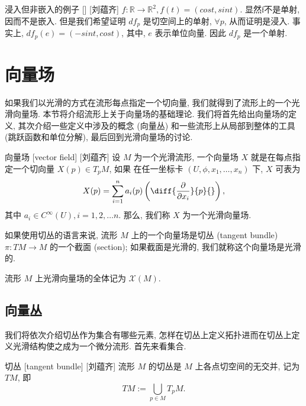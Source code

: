 \documentclass[UTF8]{ctexart}
\begin{document}
        \begin{xmp}
            []
            {浸入但非嵌入的例子}
            []
            [刘蕴齐]
             \(f: \mathbb{R} \to \mathbb{R}^2, f(t) = (cost, sint)\). 
            显然f不是单射, 因而不是嵌入. 
            但是我们希望证明  \(df_p\)  是切空间上的单射,  \(\forall p\), 从而证明是浸入. 
            事实上,  \(df_p(e) = (-sint, cost)\), 其中,  \(e\) 表示单位向量. 因此 \(df_p\) 是一个单射. 
        \end{xmp}

\section{向量场}
    
        如果我们以光滑的方式在流形每点指定一个切向量, 我们就得到了流形上的一个光滑向量场. 本节将介绍流形上关于向量场的基础理论. 我们将首先给出向量场的定义, 其次介绍一些定义中涉及的概念 (向量丛) 和一些流形上从局部到整体的工具 (跳跃函数和单位分解), 最后回到光滑向量场的讨论. 

        \begin{dfn}
            []
            {向量场}
            [vector field]
            [刘蕴齐]
            设 \(M\) 为一个光滑流形, 一个向量场 \(X\) 就是在每点指定一个切向量 \(X(p) \in T_p M\), 如果
            在任一坐标卡 \((U,\phi,x_1,\dots,x_n)\) 下,  \(X\)  可表为
            \[
            X(p)=\sum_{i=1}^{n} a_{i}(p)\left(\diff{\frac{\partial}{\partial x_{i}}}{p}{}\right),
            \]
            其中 \(a_i \in C^{\infty}(U), i = 1,2, \dots n\). 那么, 我们称  \(X\)  为一个光滑向量场. 
            
            如果使用切丛的语言来说, 流形 \(M\) 上的一个向量场是切丛 (tangent bundle)  \(\pi: TM \rightarrow M\) 的一个截面 (section); 如果截面是光滑的, 我们就称这个向量场是光滑的. 
            
            流形  \(M\)  上光滑向量场的全体记为 \(\mathcal{X}(M)\).
        \end{dfn}
    
    \subsection{向量丛}
    
        我们将依次介绍切丛作为集合有哪些元素, 怎样在切丛上定义拓扑进而在切丛上定义光滑结构使之成为一个微分流形. 首先来看集合. 
        
        \begin{dfn}
            []
            {切丛}
            [tangent bundle]
            [刘蕴齐]
            流形 \(M\) 的切丛是 \(M\) 上各点切空间的无交并, 记为 \(TM\), 即
            \[
                TM:= \displaystyle\bigcup_{p \in M} T_p M.
            \]
        \end{dfn}
\end{document}
